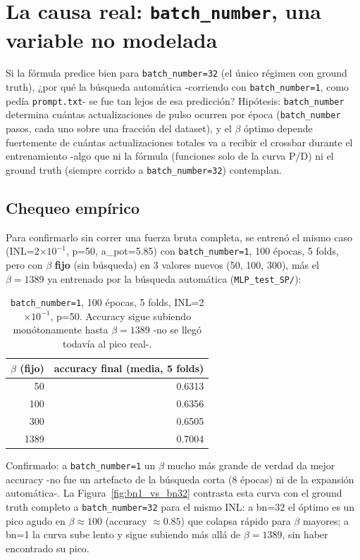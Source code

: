 \documentclass[11pt]{article}
\begin{document}
\section{La causa real: \texttt{batch\_number}, una variable no modelada}

Si la fórmula predice bien para \texttt{batch\_number=32} (el único régimen con ground truth),
¿por qué la búsqueda automática -corriendo con \texttt{batch\_number=1}, como pedía
\texttt{prompt.txt}- se fue tan lejos de esa predicción? Hipótesis: \texttt{batch\_number}
determina cuántas actualizaciones de pulso ocurren por época (\texttt{batch\_number} pasos, cada
uno sobre una fracción del dataset), y el $\beta$ óptimo depende fuertemente de cuántas
actualizaciones totales va a recibir el crossbar durante el entrenamiento -algo que ni la
fórmula (funciones solo de la curva P/D) ni el ground truth (siempre corrido a
\texttt{batch\_number=32}) contemplan.

\subsection{Chequeo empírico}

Para confirmarlo sin correr una fuerza bruta completa, se entrenó el mismo caso
(INL=2$\times10^{-1}$, p=50, a\_pot=5.85) con \texttt{batch\_number=1}, 100 épocas, 5 folds,
pero con $\beta$ \textbf{fijo} (sin búsqueda) en 3 valores nuevos (50, 100, 300), más el
$\beta=1389$ ya entrenado por la búsqueda automática (\texttt{MLP\_test\_SP/}):

\begin{table}[htbp]
\centering
\begin{tabular}{@{}rr@{}}
\toprule
$\beta$ (fijo) & accuracy final (media, 5 folds) \\
\midrule
50 & 0.6313 \\
100 & 0.6356 \\
300 & 0.6505 \\
1389 & 0.7004 \\
\bottomrule
\end{tabular}
\caption{\texttt{batch\_number=1}, 100 épocas, 5 folds, INL=2$\times10^{-1}$, p=50. Accuracy
sigue subiendo monótonamente hasta $\beta=1389$ -no se llegó todavía al pico real-.}
\end{table}

Confirmado: a \texttt{batch\_number=1} un $\beta$ mucho más grande de verdad da mejor accuracy
-no fue un artefacto de la búsqueda corta (8 épocas) ni de la expansión automática-. La
Figura~\ref{fig:bn1_vs_bn32} contrasta esta curva con el ground truth completo a
\texttt{batch\_number=32} para el mismo INL: a bn=32 el óptimo es un pico agudo en
$\beta\approx100$ (accuracy $\approx0.85$) que colapsa rápido para $\beta$ mayores; a bn=1 la
curva sube lento y sigue subiendo más allá de $\beta=1389$, sin haber encontrado su pico.
\end{document}
